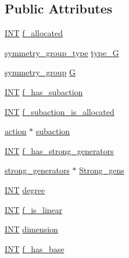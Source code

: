 \subsection*{Public Attributes}
\begin{DoxyCompactItemize}
\item 
\mbox{\hyperlink{galois_8h_a09fddde158a3a20bd2dcadb609de11dc}{I\+NT}} \mbox{\hyperlink{classaction_a00c26d5a1bf8d39e43b6a6d599fe4cc3}{f\+\_\+allocated}}
\item 
\mbox{\hyperlink{action_8h_a609fcdec33cc2d16c6c067d07931cba9}{symmetry\+\_\+group\+\_\+type}} \mbox{\hyperlink{classaction_afe244799cb488ee201e22cbe192db57d}{type\+\_\+G}}
\item 
\mbox{\hyperlink{unionsymmetry__group}{symmetry\+\_\+group}} \mbox{\hyperlink{classaction_addfe14227555f2a59914deda2382eeb8}{G}}
\item 
\mbox{\hyperlink{galois_8h_a09fddde158a3a20bd2dcadb609de11dc}{I\+NT}} \mbox{\hyperlink{classaction_a326d183238c2c5830422169c672cfc74}{f\+\_\+has\+\_\+subaction}}
\item 
\mbox{\hyperlink{galois_8h_a09fddde158a3a20bd2dcadb609de11dc}{I\+NT}} \mbox{\hyperlink{classaction_a3080cc6dfb540bc2809c53ca440cfdb3}{f\+\_\+subaction\+\_\+is\+\_\+allocated}}
\item 
\mbox{\hyperlink{classaction}{action}} $\ast$ \mbox{\hyperlink{classaction_ade6f692ab1da5e9fb5669c34b85b4823}{subaction}}
\item 
\mbox{\hyperlink{galois_8h_a09fddde158a3a20bd2dcadb609de11dc}{I\+NT}} \mbox{\hyperlink{classaction_a6983e7d8ff4f181da36b23198e15f877}{f\+\_\+has\+\_\+strong\+\_\+generators}}
\item 
\mbox{\hyperlink{classstrong__generators}{strong\+\_\+generators}} $\ast$ \mbox{\hyperlink{classaction_a45a386a60504d9cf2bc2ad4909a95d1a}{Strong\+\_\+gens}}
\item 
\mbox{\hyperlink{galois_8h_a09fddde158a3a20bd2dcadb609de11dc}{I\+NT}} \mbox{\hyperlink{classaction_a121f156ec226ef2aca731db14cadf453}{degree}}
\item 
\mbox{\hyperlink{galois_8h_a09fddde158a3a20bd2dcadb609de11dc}{I\+NT}} \mbox{\hyperlink{classaction_a8cc7eb64034644717adb0c3a8e5a8a35}{f\+\_\+is\+\_\+linear}}
\item 
\mbox{\hyperlink{galois_8h_a09fddde158a3a20bd2dcadb609de11dc}{I\+NT}} \mbox{\hyperlink{classaction_ad6467438ad4485e12d8fc4ee4acd4d90}{dimension}}
\item 
\mbox{\hyperlink{galois_8h_a09fddde158a3a20bd2dcadb609de11dc}{I\+NT}} \mbox{\hyperlink{classaction_afcbf810b8c83c29fa31fbd252bbd530e}{f\+\_\+has\+\_\+base}}

\end{DoxyCompactItemize}
